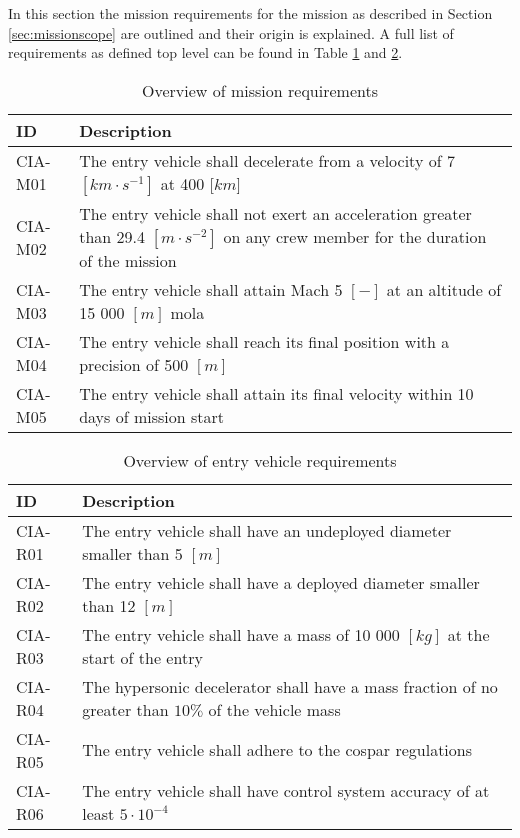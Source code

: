 In this section the mission requirements for the mission as described in Section \ref{sec:missionscope} are outlined and their origin is explained. A full list of requirements as defined top level can be found in Table \ref{tab:misreq} and \ref{tab:vehreq}.

\begin{table}[h]
	\caption{Overview of mission requirements}
	\label{tab:misreq} 
	\begin{tabular}{|p{}|p{}|}
		\hline
		\textbf{ID}          & \textbf{Description}                                                                                                      \\ \hline \hline
		CIA-M01& The entry vehicle shall decelerate from a velocity of 7 $[km\cdot s ^{-1}]$ at 400 [$km$]  \\ \hline
		CIA-M02 & The entry vehicle shall not exert an acceleration greater than 29.4 $[m \cdot s^{-2}]$ on any crew member for the duration of the mission			\\ \hline
		CIA-M03 & The entry vehicle shall attain Mach 5 $[-]$ at an altitude of 15 000 $[m]$  \gls{mola} \\ \hline
		CIA-M04 & The entry vehicle shall reach its final position with a precision of 500 $[m]$\\ \hline
		CIA-M05 & The entry vehicle shall attain its final velocity within 10 days of mission start \\ \hline
	\end{tabular}
\end{table}

\begin{table}[h]
	\caption{Overview of entry vehicle requirements} 
	\label{tab:vehreq}
	\begin{tabular}{|p{}|p{}|}
		\hline
		\textbf{ID}          & \textbf{Description}                                                                                                     \\ \hline \hline
		CIA-R01 & The entry vehicle shall have an undeployed diameter smaller than 5 $[m]$                         				            \\ \hline
		CIA-R02 & The entry vehicle shall have a deployed diameter smaller than 12 $[m]$                         				            \\ \hline	
		CIA-R03 & The entry vehicle shall have a mass of 10 000 $[kg]$ at the start of the entry                       				            \\ \hline
		CIA-R04 & The hypersonic decelerator shall have a mass fraction of no greater than $10\%$ of the vehicle mass  \\ \hline
		CIA-R05 &  The entry vehicle shall adhere to the \gls{cospar} regulations \\ \hline
		CIA-R06 &  The entry vehicle shall have control system accuracy of at least $5\cdot 10^{-4}$  \\ \hline
	\end{tabular}
\end{table}

